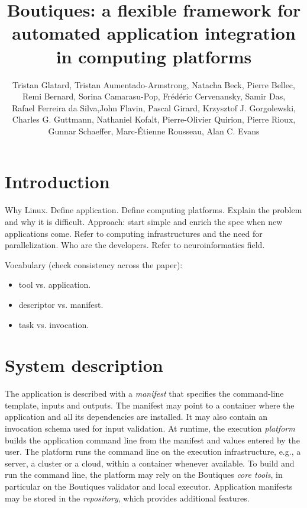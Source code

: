 \documentclass{article}
\title{Boutiques: a flexible framework for automated application integration in computing platforms}
\begin{document}
\author{Tristan Glatard, Tristan Aumentado-Armstrong, Natacha Beck, Pierre Bellec,\\
        Remi Bernard, Sorina Camarasu-Pop, Fr\'ed\'eric Cervenansky, Samir Das, \\
        Rafael Ferreira da Silva,John Flavin, Pascal Girard, Krzysztof J. Gorgolewski, \\
        Charles G. Guttmann, Nathaniel Kofalt, Pierre-Olivier Quirion, Pierre Rioux,\\
        Gunnar Schaeffer, Marc-\'Etienne Rousseau, Alan C. Evans}

\maketitle

\section{Introduction}

Why Linux. Define application. Define computing platforms. Explain the
problem and why it is difficult. Approach: start simple and enrich the
spec when new applications come. Refer to computing infrastructures
and the need for parallelization. Who are
the developers. Refer to neuroinformatics field. 

Vocabulary (check consistency across the paper):
\begin{itemize}
\item tool vs. application.
\item descriptor vs. manifest.
\item task vs. invocation.
\end{itemize}

\section{System description}

The application is described with a \emph{manifest} that specifies the
command-line template, inputs and outputs. The manifest may point to a
container where the application and all its dependencies are
installed. It may also contain an invocation schema used for input
validation. At runtime, the execution \emph{platform} builds the
application command line from the manifest and values entered by the
user. The platform runs the command line on the execution
infrastructure, e.g., a server, a cluster or a cloud, within a
container whenever available. To build and run the command line, the
platform may rely on the Boutiques \emph{core tools}, in particular on
the Boutiques validator and local executor. Application manifests may
be stored in the \emph{repository}, which provides additional features.
\end{document}
